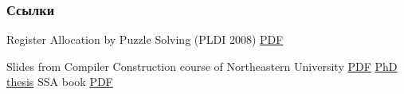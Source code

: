 \documentclass[aspectratio=169
  , xcolor={svgnames}
  , hyperref={ colorlinks,citecolor=DeepPink4
             , linkcolor=DarkRed,urlcolor=DarkBlue}
  , russian
  ]{beamer}
\theoremstyle{exerciseStyle1}
\begin{document}
 \begin{frame}[allowframebreaks]
   \frametitle<presentation>{Ссылки}
   \begin{thebibliography}{10}
     Register Allocation by Puzzle Solving (PLDI 2008)
     \newblock \href{http://conal.net/papers/compiling-to-categories/compiling-to-categories.pdf}{PDF}
           
     Slides from Compiler Construction course of Northeastern University
     \newblock \href{https://users.cs.northwestern.edu/~robby/courses/322-2016-spring/puzzle_solving.pdf}{PDF}
     \href{http://compilers.cs.ucla.edu/fernando/publications/papers/PhdDiss.pdf}{PhD thesis}
      SSA book
     \href{http://ssabook.gforge.inria.fr/latest/book.pdf}{PDF} 
   \end{thebibliography}
 \end{frame}
\end{document}
